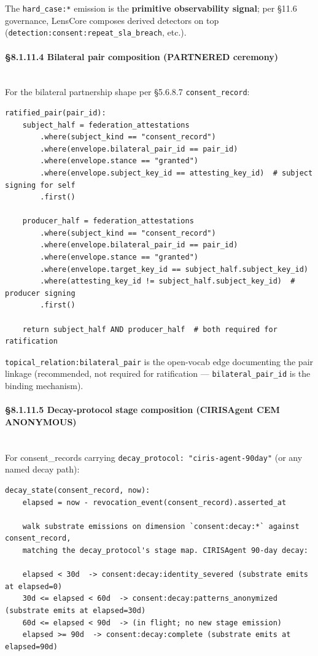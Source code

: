 \documentclass[10pt]{article}
\begin{document}
The \texttt{hard\_case:*} emission is the \textbf{primitive observability signal}; per §11.6 governance, LensCore composes derived detectors on top (\texttt{detection:consent:repeat\_sla\_breach}, etc.).


\paragraph{§8.1.11.4 Bilateral pair composition (PARTNERED ceremony)}\mbox{}\\


For the bilateral partnership shape per §5.6.8.7 \texttt{consent\_record}:


\begin{lstlisting}
ratified_pair(pair_id):
    subject_half = federation_attestations
        .where(subject_kind == "consent_record")
        .where(envelope.bilateral_pair_id == pair_id)
        .where(envelope.stance == "granted")
        .where(envelope.subject_key_id == attesting_key_id)  # subject signing for self
        .first()

    producer_half = federation_attestations
        .where(subject_kind == "consent_record")
        .where(envelope.bilateral_pair_id == pair_id)
        .where(envelope.stance == "granted")
        .where(envelope.target_key_id == subject_half.subject_key_id)
        .where(attesting_key_id != subject_half.subject_key_id)  # producer signing
        .first()

    return subject_half AND producer_half  # both required for ratification
\end{lstlisting}

\texttt{topical\_relation:bilateral\_pair} is the open-vocab edge documenting the pair linkage (recommended, not required for ratification — \texttt{bilateral\_pair\_id} is the binding mechanism).


\paragraph{§8.1.11.5 Decay-protocol stage composition (CIRISAgent CEM ANONYMOUS)}\mbox{}\\


For consent\_records carrying \texttt{decay\_protocol: "ciris-agent-90day"} (or any named decay path):


\begin{lstlisting}
decay_state(consent_record, now):
    elapsed = now - revocation_event(consent_record).asserted_at

    walk substrate emissions on dimension `consent:decay:*` against consent_record,
    matching the decay_protocol's stage map. CIRISAgent 90-day decay:

    elapsed < 30d  -> consent:decay:identity_severed (substrate emits at elapsed=0)
    30d <= elapsed < 60d  -> consent:decay:patterns_anonymized (substrate emits at elapsed=30d)
    60d <= elapsed < 90d  -> (in flight; no new stage emission)
    elapsed >= 90d  -> consent:decay:complete (substrate emits at elapsed=90d)
\end{lstlisting}
\end{document}
